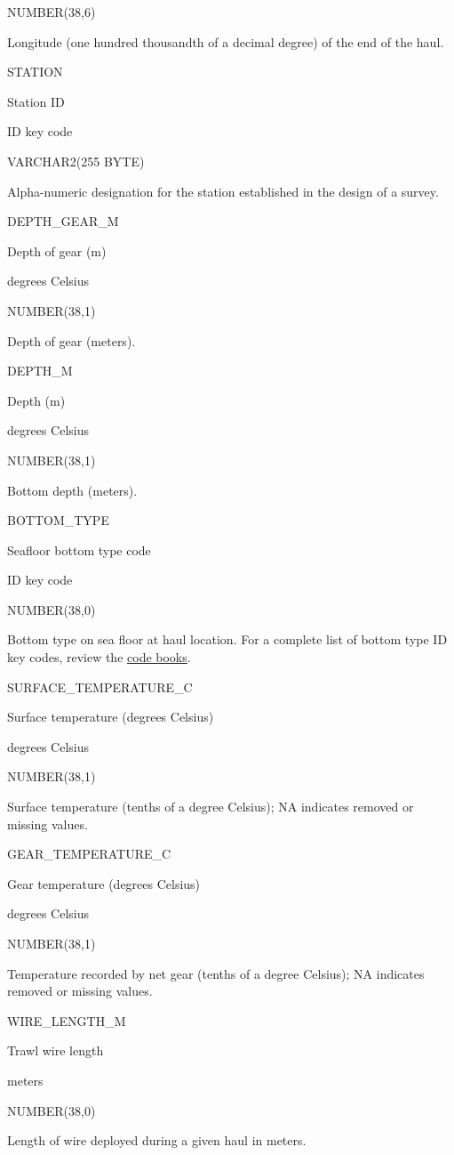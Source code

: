 \documentclass[
  letterpaper,
  oneside,
  open=any]{scrbook}
\begin{document}
NUMBER(38,6)

Longitude (one hundred thousandth of a decimal degree) of the end of the
haul.

STATION

Station ID

ID key code

VARCHAR2(255 BYTE)

Alpha-numeric designation for the station established in the design of a
survey.

DEPTH\_GEAR\_M

Depth of gear (m)

degrees Celsius

NUMBER(38,1)

Depth of gear (meters).

DEPTH\_M

Depth (m)

degrees Celsius

NUMBER(38,1)

Bottom depth (meters).

BOTTOM\_TYPE

Seafloor bottom type code

ID key code

NUMBER(38,0)

Bottom type on sea floor at haul location. For a complete list of bottom
type ID key codes, review the
\href{https://www.fisheries.noaa.gov/resource/document/groundfish-survey-species-code-manual-and-data-codes-manual}{code
books}.

SURFACE\_TEMPERATURE\_C

Surface temperature (degrees Celsius)

degrees Celsius

NUMBER(38,1)

Surface temperature (tenths of a degree Celsius); NA indicates removed
or missing values.

GEAR\_TEMPERATURE\_C

Gear temperature (degrees Celsius)

degrees Celsius

NUMBER(38,1)

Temperature recorded by net gear (tenths of a degree Celsius); NA
indicates removed or missing values.

WIRE\_LENGTH\_M

Trawl wire length

meters

NUMBER(38,0)

Length of wire deployed during a given haul in meters.
\end{document}
